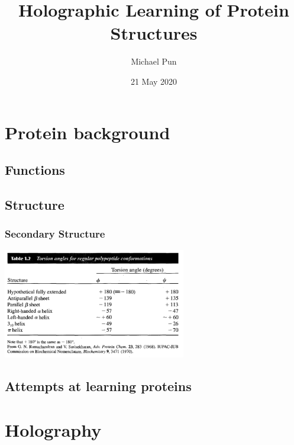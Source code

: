 \documentclass{article}
\title{Holographic Learning of Protein Structures}
\author{Michael Pun}
\date{21 May 2020}
\begin{document}
\maketitle

\tableofcontents

%
%
\section{Protein background}
\subsection{Functions}

\subsection{Structure}

\subsubsection{Secondary Structure}

\includegraphics[width=8cm]{Ramachandran_angle_classification.png}

\subsection{Attempts at learning proteins}


%
%
\section{Holography}
\end{document}
